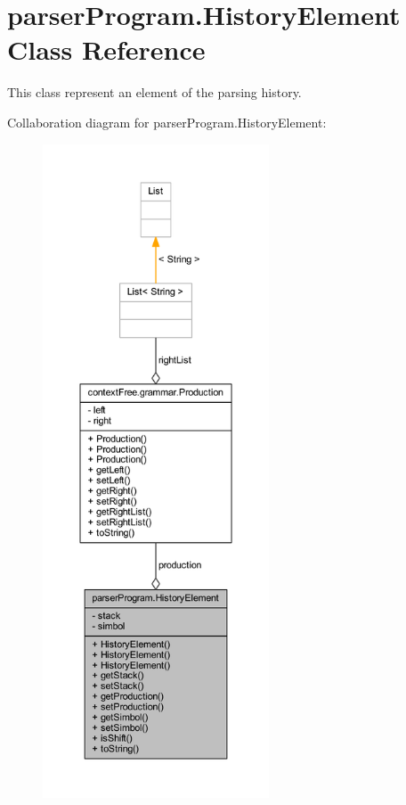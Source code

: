 \hypertarget{classparser_program_1_1_history_element}{\section{parser\-Program.\-History\-Element Class Reference}
\label{classparser_program_1_1_history_element}
}


This class represent an element of the parsing history.  




Collaboration diagram for parser\-Program.\-History\-Element\-:
\nopagebreak
\begin{figure}[H]
\begin{center}
\leavevmode
\includegraphics[height=550pt]{classparser_program_1_1_history_element__coll__graph}
\end{center}
\end{figure}
